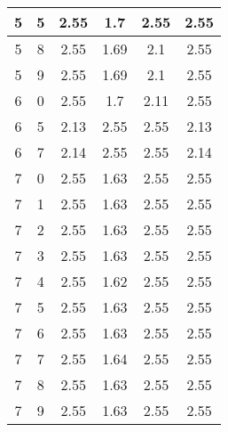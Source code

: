 \begin{longtable}{|c|c||c||c|c||c|}
	5 & 5 & 2.55 & 1.7 & 2.55 & 2.55 \\ \hline
	5 & 8 & 2.55 & 1.69 & 2.1 & 2.55 \\ \hline
	5 & 9 & 2.55 & 1.69 & 2.1 & 2.55 \\ \hline
	6 & 0 & 2.55 & 1.7 & 2.11 & 2.55 \\ \hline
	6 & 5 & 2.13 & 2.55 & 2.55 & 2.13 \\ \hline
	6 & 7 & 2.14 & 2.55 & 2.55 & 2.14 \\ \hline
	7 & 0 & 2.55 & 1.63 & 2.55 & 2.55 \\ \hline
	7 & 1 & 2.55 & 1.63 & 2.55 & 2.55 \\ \hline
	7 & 2 & 2.55 & 1.63 & 2.55 & 2.55 \\ \hline
	7 & 3 & 2.55 & 1.63 & 2.55 & 2.55 \\ \hline
	7 & 4 & 2.55 & 1.62 & 2.55 & 2.55 \\ \hline
	7 & 5 & 2.55 & 1.63 & 2.55 & 2.55 \\ \hline
	7 & 6 & 2.55 & 1.63 & 2.55 & 2.55 \\ \hline
	7 & 7 & 2.55 & 1.64 & 2.55 & 2.55 \\ \hline
	7 & 8 & 2.55 & 1.63 & 2.55 & 2.55 \\ \hline
	7 & 9 & 2.55 & 1.63 & 2.55 & 2.55 \\ \hline
\end{longtable}
\clearpage{}
